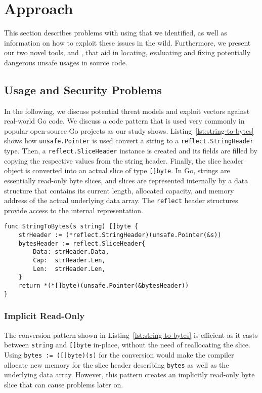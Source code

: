\section{Approach}
\label{sec:appr}

This section describes problems with using \unsafe{} that we identified, as well as information on how to exploit these issues in the wild.
Furthermore, we present our two novel tools, \toolUsage{} and \toolSA{}, that aid in locating, evaluating and fixing potentially dangerous unsafe usages in source code.

\subsection{Usage and Security Problems}

In the following, we discuss potential threat models and exploit vectors against real-world \unsafe{} Go code.
We discuss a code pattern that is used very commonly in popular open-source Go projects as our study shows.
Listing~\ref{lst:string-to-bytes} shows how \texttt{unsafe.Pointer} is used convert a string to a \texttt{reflect.StringHeader} type.
Then, a \texttt{reflect.SliceHeader} instance is created and its fields are filled by copying the respective values from the string header.
Finally, the slice header object is converted into an actual slice of type \texttt{[]byte}.
In Go, strings are essentially read-only byte slices, and slices are represented internally by a data structure that contains its current length, allocated capacity, and memory address of the actual underlying data array.
The \texttt{reflect} header structures provide access to the internal representation.

\begin{lstlisting}[language=Golang, label=lst:string-to-bytes, caption=Common Usage of Unsafe: Conversion from String to Bytes]
func StringToBytes(s string) []byte {
	strHeader := (*reflect.StringHeader)(unsafe.Pointer(&s))
	bytesHeader := reflect.SliceHeader{
		Data: strHeader.Data,
		Cap:  strHeader.Len,
		Len:  strHeader.Len,
	}
	return *(*[]byte)(unsafe.Pointer(&bytesHeader))
}
\end{lstlisting}


\subsubsection*{Implicit Read-Only}

The conversion pattern shown in Listing~\ref{lst:string-to-bytes} is efficient as it casts between \texttt{string} and \texttt{[]byte} in-place, without the need of reallocating the slice.
Using \texttt{bytes := ([]byte)(s)} for the conversion would make the compiler allocate new memory for the slice header describing \texttt{bytes} as well as the underlying data array.
However, this pattern creates an implicitly read-only byte slice that can cause problems later on.

